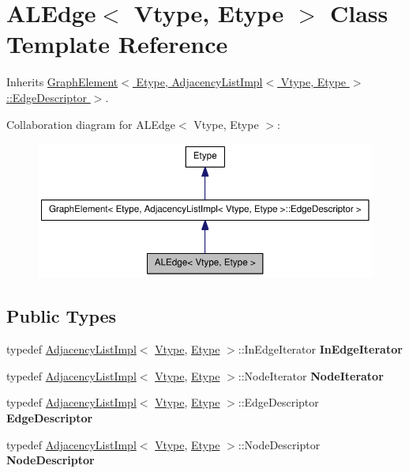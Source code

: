 \hypertarget{class_a_l_edge}{
\section{ALEdge$<$ Vtype, Etype $>$ Class Template Reference}
\label{class_a_l_edge}
}


Inherits \hyperlink{class_graph_element}{GraphElement$<$ Etype, AdjacencyListImpl$<$ Vtype, Etype $>$::EdgeDescriptor $>$}.



Collaboration diagram for ALEdge$<$ Vtype, Etype $>$:\nopagebreak
\begin{figure}[H]
\begin{center}
\leavevmode
\includegraphics[width=400pt]{class_a_l_edge__coll__graph}
\end{center}
\end{figure}
\subsection*{Public Types}
\begin{DoxyCompactItemize}
\item 
\hypertarget{class_a_l_edge_aeb97eafc4a03f2d5cdcbc6808f8464a1}{
typedef \hyperlink{class_adjacency_list_impl}{AdjacencyListImpl}$<$ \hyperlink{class_vtype}{Vtype}, \hyperlink{class_etype}{Etype} $>$::InEdgeIterator {\bfseries InEdgeIterator}}
\label{class_a_l_edge_aeb97eafc4a03f2d5cdcbc6808f8464a1}

\item 
\hypertarget{class_a_l_edge_a2b78556e10b35fe6bc5bc4c76ea0b8e4}{
typedef \hyperlink{class_adjacency_list_impl}{AdjacencyListImpl}$<$ \hyperlink{class_vtype}{Vtype}, \hyperlink{class_etype}{Etype} $>$::NodeIterator {\bfseries NodeIterator}}
\label{class_a_l_edge_a2b78556e10b35fe6bc5bc4c76ea0b8e4}

\item 
\hypertarget{class_a_l_edge_a18151ee1b48acb3c0d618345279784ae}{
typedef \hyperlink{class_adjacency_list_impl}{AdjacencyListImpl}$<$ \hyperlink{class_vtype}{Vtype}, \hyperlink{class_etype}{Etype} $>$::EdgeDescriptor {\bfseries EdgeDescriptor}}
\label{class_a_l_edge_a18151ee1b48acb3c0d618345279784ae}

\item 
\hypertarget{class_a_l_edge_acfa5ba11abd6ab0c88a12313ef1671b1}{
typedef \hyperlink{class_adjacency_list_impl}{AdjacencyListImpl}$<$ \hyperlink{class_vtype}{Vtype}, \hyperlink{class_etype}{Etype} $>$::NodeDescriptor {\bfseries NodeDescriptor}}
\label{class_a_l_edge_acfa5ba11abd6ab0c88a12313ef1671b1}

\end{DoxyCompactItemize}
